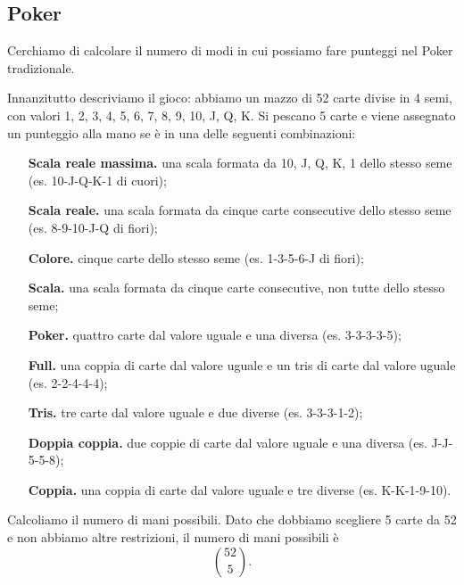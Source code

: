 \subsection{Poker}

Cerchiamo di calcolare il numero di modi in cui possiamo fare punteggi nel Poker tradizionale. 

Innanzitutto descriviamo il gioco: abbiamo un mazzo di 52 carte divise in 4 semi, con valori 1, 2, 3, 4, 5, 6, 7, 8, 9, 10, J, Q, K.
Si pescano 5 carte e viene assegnato un punteggio alla mano se è in una delle seguenti combinazioni: \begin{itemize}
    \item[\textbf{Scala reale massima.}] una scala formata da 10, J, Q, K, 1 dello stesso seme (es. 10-J-Q-K-1 di cuori);
    \item[\textbf{Scala reale.}]  una scala formata da cinque carte consecutive dello stesso seme (es. 8-9-10-J-Q di fiori);
    \item[\textbf{Colore.}]  cinque carte dello stesso seme (es. 1-3-5-6-J di fiori);    
    \item[\textbf{Scala.}] una scala formata da cinque carte consecutive, non tutte dello stesso seme;
    \item[\textbf{Poker.}]  quattro carte dal valore uguale e una diversa (es. 3-3-3-3-5);
    \item[\textbf{Full.}] una coppia di carte dal valore uguale e un tris di carte dal valore uguale (es. 2-2-4-4-4);
    \item[\textbf{Tris.}] tre carte dal valore uguale e due diverse (es. 3-3-3-1-2);
    \item[\textbf{Doppia coppia.}] due coppie di carte dal valore uguale e una diversa (es. J-J-5-5-8);
    \item[\textbf{Coppia.}]una coppia di carte dal valore uguale e tre diverse (es. K-K-1-9-10).
\end{itemize}

Calcoliamo il numero di mani possibili. Dato che dobbiamo scegliere 5 carte da 52 e non abbiamo altre restrizioni, il numero di mani possibili è \[\binom{52}{5}.\]

